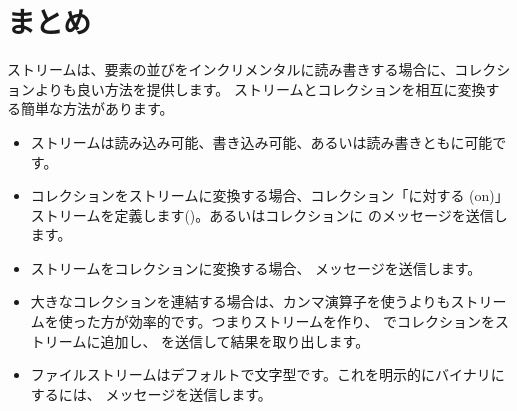 \documentclass[a4paper,10pt,twoside]{book}
\begin{document}
\section{まとめ}

ストリームは、要素の並びをインクリメンタルに読み書きする場合に、コレクションよりも良い方法を提供します。
ストリームとコレクションを相互に変換する簡単な方法があります。

\begin{itemize}
  \item ストリームは読み込み可能、書き込み可能、あるいは読み書きともに可能です。
  \item コレクションをストリームに変換する場合、コレクション「に対する (on)」ストリームを定義します(\eg {})。あるいはコレクションに  \etc{}のメッセージを送信します。
  \item ストリームをコレクションに変換する場合、 メッセージを送信します。
  \item 大きなコレクションを連結する場合は、カンマ演算子を使うよりもストリームを使った方が効率的です。つまりストリームを作り、 でコレクションをストリームに追加し、 を送信して結果を取り出します。
  \item ファイルストリームはデフォルトで文字型です。これを明示的にバイナリにするには、 メッセージを送信します。
\end{itemize}

\ifx\wholebook\relax\else
\end{document}
